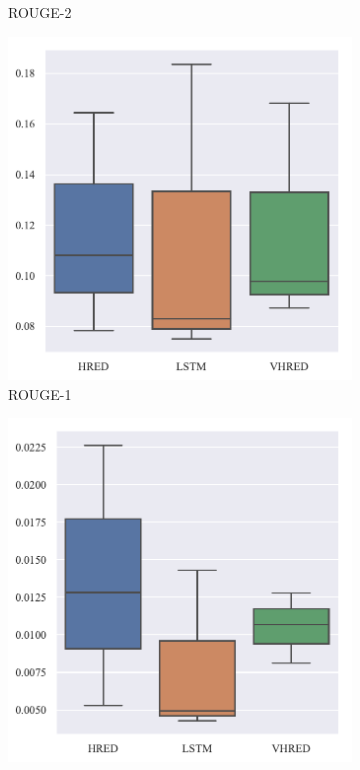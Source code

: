 \begin{figure}[H]
\begin{subfigure}{0.25\linewidth}
        \caption{ROUGE-2}
    \end{subfigure}%
    \begin{subfigure}{0.25\linewidth}
        \centering
        \includegraphics[width=\linewidth]{figure/boxplot/model/rouge_1/plot.pdf}
        \caption{ROUGE-1}
    \end{subfigure}%
    \begin{subfigure}{0.25\linewidth}
        \centering
        \includegraphics[width=\linewidth]{figure/boxplot/model/rouge_2/plot.pdf}

\end{subfigure}
\end{figure}

